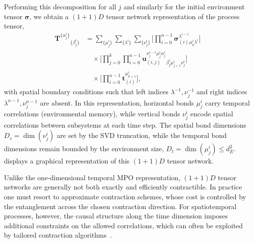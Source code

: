 \documentclass[
    aps,
    prx,
    reprint,
    superscriptaddress,
    longbibliography,
    nofootinbib,
    floatfix,
]{revtex4-2}
\begin{document}
Performing this decomposition for all \(j\) and similarly for the initial environment tensor \(\pmb{\sigma}\), we obtain a \((1+1)D\) tensor network representation of the process tensor,
\begin{equation}
\begin{aligned}
    \mathbf{T}^{\{\alpha_j^i\}}{}_{\{\beta_j^i\}}
    &=
    \sum_{\{\mu_j^i\}}
    \sum_{\{\lambda^i\}}
    \sum_{\{\nu_j^i\}}
    \Biggl[
        \prod_{i=0}^{n-1}
        \pmb{\sigma}_{(i)}^{\lambda^{i-1}}{}_{\mu_0^i\lambda^i}
    \Biggr]
    \\
    &\quad{}\times
    \Biggl[
        \prod_{j=0}^{k}
        \prod_{i=0}^{n-1}
        \mathbf{u}_{(i,j)}^{\nu^{i-1}_j\mu_j^i\alpha_j^i}
        {}_{\beta_j^i\mu_{j+1}^i\nu_j^i}
    \Biggr]
    \\
    &\quad{}\times
    \Biggl[
        \prod_{i=0}^{n-1}
        \mathbf{t}_{(i)}^{\mu_{k+1}^i}
    \Biggr],
\end{aligned}
\end{equation}
with spatial boundary conditions such that left indices \(\lambda^{-1}, \nu^{-1}_j\) and right indices \(\lambda^{n-1}, \nu^{n-1}_j\) are absent. In this representation, horizontal bonds \(\mu_j^i\) carry temporal correlations (environmental memory), while vertical bonds \(\nu_j^i\) encode spatial correlations between subsystems at each time step. The spatial bond dimensions \(D_s = \dim(\nu_j^i)\) are set by the SVD truncation, while the temporal bond dimensions remain bounded by the environment size, \(D_t = \dim(\mu_j^i) \le d_E^2\).  displays a graphical representation of this \((1+1)D\) tensor network.

Unlike the one-dimensional temporal MPO representation, \((1+1)D\) tensor networks are generally not both exactly and efficiently contractible. In practice one must resort to approximate contraction schemes, whose cost is controlled by the entanglement across the chosen contraction direction. For 
spatiotemporal processes, however, the causal structure along the time dimension imposes additional constraints on the allowed correlations, which can often be exploited by tailored contraction algorithms~\cite{jorgensenExploitingCausalTensor2019,keelingProcessTensorApproaches2025}.
\end{document}
